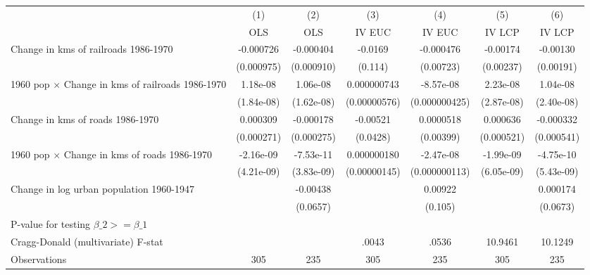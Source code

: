 {
\def\sym#1{\ifmmode^{#1}\else\(^{#1}\)\fi}
\begin{tabular}{l*{6}{c}}
\hline\hline
                &\multicolumn{1}{c}{(1)}&\multicolumn{1}{c}{(2)}&\multicolumn{1}{c}{(3)}&\multicolumn{1}{c}{(4)}&\multicolumn{1}{c}{(5)}&\multicolumn{1}{c}{(6)}\\
                &\multicolumn{1}{c}{OLS}&\multicolumn{1}{c}{OLS}&\multicolumn{1}{c}{IV EUC}&\multicolumn{1}{c}{IV EUC}&\multicolumn{1}{c}{IV LCP}&\multicolumn{1}{c}{IV LCP}\\
\hline
Change in kms of railroads 1986-1970&-0.000726         &-0.000404         &  -0.0169         &-0.000476         & -0.00174         & -0.00130         \\
                &(0.000975)         &(0.000910)         &  (0.114)         &(0.00723)         &(0.00237)         &(0.00191)         \\
[1em]
1960 pop $\times$ Change in kms of railroads 1986-1970& 1.18e-08         & 1.06e-08         &0.000000743         &-8.57e-08         & 2.23e-08         & 1.04e-08         \\
                &(1.84e-08)         &(1.62e-08)         &(0.00000576)         &(0.000000425)         &(2.87e-08)         &(2.40e-08)         \\
[1em]
Change in kms of roads 1986-1970& 0.000309         &-0.000178         & -0.00521         &0.0000518         & 0.000636         &-0.000332         \\
                &(0.000271)         &(0.000275)         & (0.0428)         &(0.00399)         &(0.000521)         &(0.000541)         \\
[1em]
1960 pop $\times$ Change in kms of roads 1986-1970&-2.16e-09         &-7.53e-11         &0.000000180         &-2.47e-08         &-1.99e-09         &-4.75e-10         \\
                &(4.21e-09)         &(3.83e-09)         &(0.00000145)         &(0.000000113)         &(6.05e-09)         &(5.43e-09)         \\
[1em]
Change in log urban population 1960-1947&                  & -0.00438         &                  &  0.00922         &                  & 0.000174         \\
                &                  & (0.0657)         &                  &  (0.105)         &                  & (0.0673)         \\
\hline
P-value for testing $\beta\_{2} >= \beta\_{1}$&                  &                  &                  &                  &                  &                  \\
Cragg-Donald (multivariate) F-stat&                  &                  &    .0043         &    .0536         &  10.9461         &  10.1249         \\
Observations    &      305         &      235         &      305         &      235         &      305         &      235         \\
\hline\hline
\end{tabular}
}
